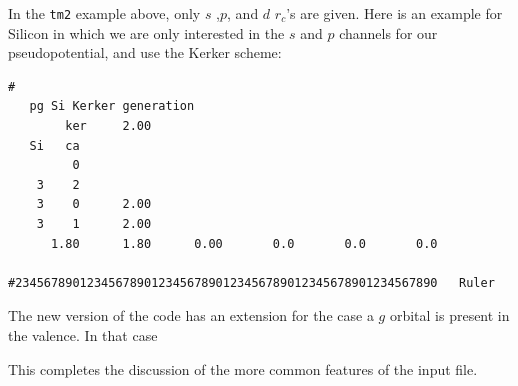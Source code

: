 \documentclass[11pt]{article}
\begin{document}
In the {\tt tm2} example above, only $s$ ,$p$, and $d$ $r_c$'s are
given. Here is an example for Silicon in which we are only interested
in the $s$ and $p$ channels for our pseudopotential, and use the Kerker
scheme:

\begin{verbatim}
#
   pg Si Kerker generation
        ker     2.00
   Si   ca
         0
    3    2
    3    0      2.00
    3    1      2.00
      1.80      1.80      0.00       0.0       0.0       0.0

#23456789012345678901234567890123456789012345678901234567890   Ruler
\end{verbatim}

The new version of the code has an extension for the case a $g$ orbital is present
in the valence.  In that case


This completes the discussion of the more common features of the input
file.
\end{document}
